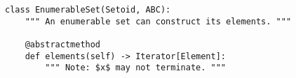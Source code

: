 \par\begin{minipage}{60ex}
\begin{verbatim}
class EnumerableSet(Setoid, ABC):
    """ An enumerable set can construct its elements. """

    @abstractmethod
    def elements(self) -> Iterator[Element]:
        """ Note: $x$ may not terminate. """
\end{verbatim}
\end{minipage}\par